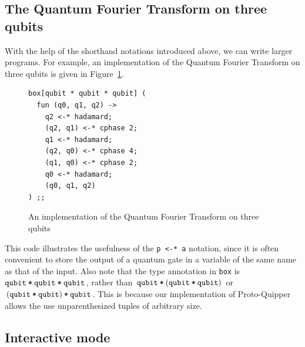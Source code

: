 \subsection{The Quantum Fourier Transform on three qubits}

With the help of the shorthand notations introduced above, we can write 
larger programs. For example, an implementation of the Quantum Fourier 
Transform on three qubits is given in Figure~\ref{fig-qft3}.
\begin{figure}[!ht]
\begin{splitcode}
\begin{verbatim}
box[qubit * qubit * qubit] (
  fun (q0, q1, q2) ->
    q2 <-* hadamard;
    (q2, q1) <-* cphase 2;
    q1 <-* hadamard;
    (q2, q0) <-* cphase 4;
    (q1, q0) <-* cphase 2;
    q0 <-* hadamard;
    (q0, q1, q2)
) ;;
\end{verbatim}
  \split {}
\end{splitcode}
\caption{An implementation of the Quantum Fourier
Transform on three qubits}
\label{fig-qft3}
\end{figure}
This code illustrates the usefulness of the \verb#p <-* a# notation,
since it is often convenient to store the output of a quantum gate in
a variable of the same name as that of the input. Also note that the
type annotation in \verb#box# is $\texttt{qubit}\mathbin{\texttt{*}}\texttt{qubit}\mathbin{\texttt{*}}\texttt{qubit}$, rather
than $\texttt{qubit}\mathbin{\texttt{*}}(\texttt{qubit}\mathbin{\texttt{*}}\texttt{qubit})$ or $(\texttt{qubit}\mathbin{\texttt{*}}\texttt{qubit})\mathbin{\texttt{*}}\texttt{qubit}$.
This is because our implementation of Proto-Quipper allows the use
unparenthesized tuples of arbitrary size.

\subsection{Interactive mode}

